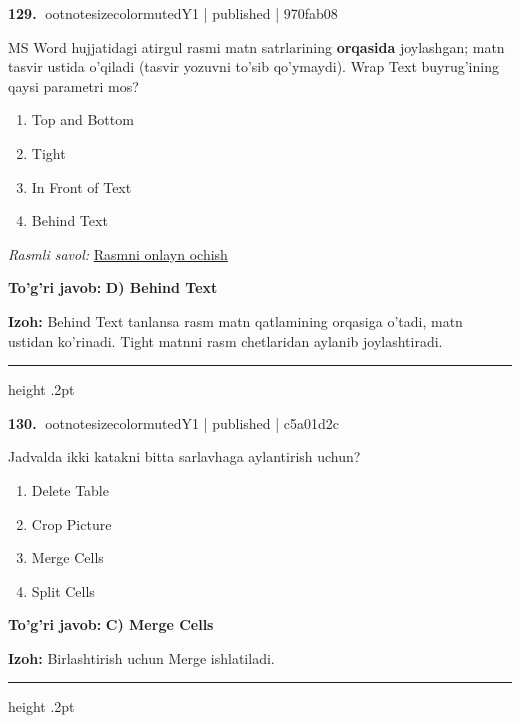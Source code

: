 \documentclass[10pt,a4paper]{article}
\begin{document}
\textbf{\color{ink}129.} {ootnotesizecolor{muted}Y1 | published | 970fab08}
\par
MS Word hujjatidagi atirgul rasmi matn satrlarining \textbf{orqasida} joylashgan; matn tasvir ustida o'qiladi (tasvir yozuvni to'sib qo'ymaydi). Wrap Text buyrug'ining qaysi parametri mos?
\begin{enumerate}[label=\Alph*),leftmargin=9mm]
\item Top and Bottom
\item Tight
\item In Front of Text
\item Behind Text
\end{enumerate}
\par\smallskip\textit{Rasmli savol: }\href{https://github.com/sarvar9417/attestatsiya/blob/main/public/kuzgi-demo/demo_q39_word.svg}{Rasmni onlayn ochish}
\begin{tcolorbox}[enhanced,breakable,colback=teal!4,colframe=teal!55!black,boxrule=0.45pt,arc=1.2mm,left=2.8mm,right=2.8mm,top=2mm,bottom=2mm]
\textbf{\color{teal}To'g'ri javob:} \textbf{D) Behind Text}
\par\smallskip
\textbf{Izoh:} Behind Text tanlansa rasm matn qatlamining orqasiga o'tadi, matn ustidan ko'rinadi. Tight matnni rasm chetlaridan aylanib joylashtiradi.
\end{tcolorbox}
\vspace{2mm}\hrule height .2pt\vspace{2mm}

\textbf{\color{ink}130.} {ootnotesizecolor{muted}Y1 | published | c5a01d2c}
\par
Jadvalda ikki katakni bitta sarlavhaga aylantirish uchun?
\begin{enumerate}[label=\Alph*),leftmargin=9mm]
\item Delete Table
\item Crop Picture
\item Merge Cells
\item Split Cells
\end{enumerate}
\begin{tcolorbox}[enhanced,breakable,colback=teal!4,colframe=teal!55!black,boxrule=0.45pt,arc=1.2mm,left=2.8mm,right=2.8mm,top=2mm,bottom=2mm]
\textbf{\color{teal}To'g'ri javob:} \textbf{C) Merge Cells}
\par\smallskip
\textbf{Izoh:} Birlashtirish uchun Merge ishlatiladi.
\end{tcolorbox}
\vspace{2mm}\hrule height .2pt\vspace{2mm}
\end{document}
